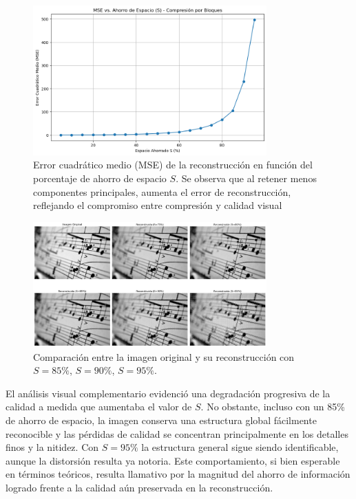 \documentclass[12pt]{article}
\begin{document}
\begin{figure}[H]
    \centering
    \includegraphics[width=0.8\textwidth]{Ejercicio5.png}
    \caption{Error cuadrático medio (MSE) de la reconstrucción en función del porcentaje de ahorro de espacio $S$. Se observa que al retener menos componentes principales, aumenta el error de reconstrucción, reflejando el compromiso entre compresión y calidad visual}
    \label{fig:mse}
\end{figure}

\begin{figure}[H]
    \centering
    \includegraphics[width=0.8\textwidth]{Ejercicio6.png}
    \caption{Comparación entre la imagen original y su reconstrucción con $S=85\%$, $S=90\%$, $S=95\%$.}
    \label{fig:ej6}
\end{figure}

El análisis visual complementario evidenció una degradación progresiva de la calidad a medida que aumentaba el valor de $S$. No obstante, incluso con un 85\% de ahorro de espacio, la imagen conserva una estructura global fácilmente reconocible y las pérdidas de calidad se concentran principalmente en los detalles finos y la nitidez. Con $S=95\%$ la estructura general sigue siendo identificable, aunque la distorsión resulta ya notoria. Este comportamiento, si bien esperable en términos teóricos, resulta llamativo por la magnitud del ahorro de información logrado frente a la calidad aún preservada en la reconstrucción.
\end{document}
